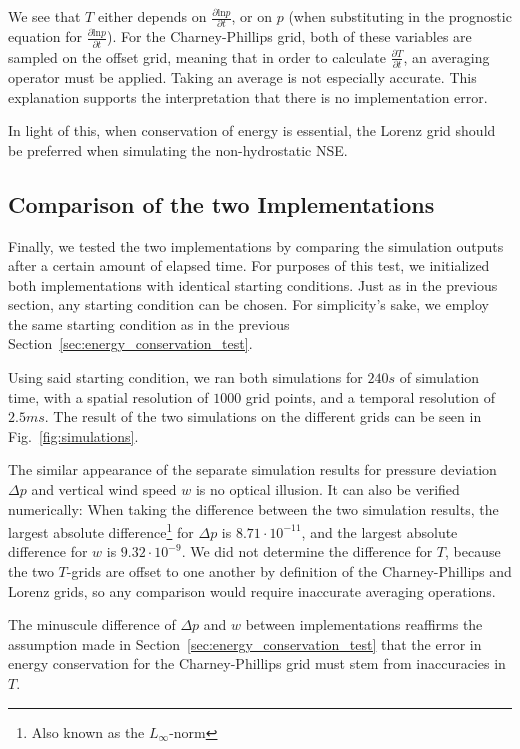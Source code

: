 We see that $T$ either depends on $\frac{\partial \text{ln}p}{\partial t}$, or on $p$ (when substituting in the prognostic equation for $\frac{\partial \text{ln}p}{\partial t}$).
For the Charney-Phillips grid, both of these variables are sampled on the offset grid, meaning that in order to calculate $\frac{\partial T}{\partial t}$, an averaging operator must be applied.
Taking an average is not especially accurate.
This explanation supports the interpretation that there is no implementation error.

In light of this, when conservation of energy is essential, the Lorenz grid should be preferred when simulating the non-hydrostatic NSE.

\subsection{Comparison of the two Implementations}
Finally, we tested the two implementations by comparing the simulation outputs after a certain amount of elapsed time.
For purposes of this test, we initialized both implementations with identical starting conditions.
Just as in the previous section, any starting condition can be chosen.
For simplicity's sake, we employ the same starting condition as in the previous Section~\ref{sec:energy_conservation_test}.

Using said starting condition, we ran both simulations for $240s$ of simulation time, with a spatial resolution of $1000$ grid points, and a temporal resolution of $2.5ms$.
The result of the two simulations on the different grids can be seen in Fig.~\ref{fig:simulations}.

The similar appearance of the separate simulation results for pressure deviation $\Delta p$ and vertical wind speed $w$ is no optical illusion.
It can also be verified numerically:
When taking the difference between the two simulation results, the largest absolute difference\footnote{Also known as the $L_\infty$-norm} for $\Delta p$ is $8.71\cdot 10^{-11}$, and the largest absolute difference for $w$ is $9.32\cdot 10^{-9}$.
We did not determine the difference for $T$, because the two $T$-grids are offset to one another by definition of the Charney-Phillips and Lorenz grids, so any comparison would require inaccurate averaging operations.

The minuscule difference of $\Delta p$ and $w$ between implementations reaffirms the assumption made in Section~\ref{sec:energy_conservation_test} that the error in energy conservation for the Charney-Phillips grid must stem from inaccuracies in $T$.

